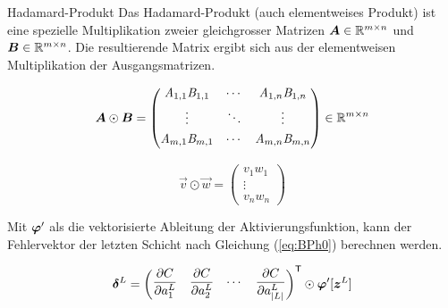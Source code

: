 \begin{appendices}
\begin{defbox}{Hadamard-Produkt}
  Das Hadamard-Produkt (auch elementweises Produkt) ist eine spezielle Multiplikation zweier gleichgrosser Matrizen
  $\bm{A} \in \mathbb{R}^{m \times n}$ und $\bm{B} \in \mathbb{R}^{m \times n}$.
  Die resultierende Matrix ergibt sich aus der elementweisen Multiplikation der Ausgangsmatrizen.

  \begin{minipage}{0.5\textwidth}
    \begin{equation*}
      \bm{A} \odot \bm{B} =
      \begin{pmatrix}
        \mathit{A}_{1,1} \mathit{B}_{1,1} & \cdots & \mathit{A}_{1,n} \mathit{B}_{1,n} \\[0.3em]
        \vdots & \ddots & \vdots \\[0.3em]
        \mathit{A}_{m,1} \mathit{B}_{m,1} & \cdots & \mathit{A}_{m,n} \mathit{B}_{m,n} \\[0.3em]
      \end{pmatrix}
      \in \mathbb{R}^{m \times n}
    \end{equation*}
  \end{minipage}
  \begin{minipage}{0.5\textwidth}
    \begin{equation*}
      \vec{v} \odot \vec{w} =
      \begin{pmatrix}
        v_1 w_1 \\
        \vdots \\
        v_n w_n
      \end{pmatrix}
    \end{equation*}

  \end{minipage}
\end{defbox}
\para{}

Mit $\bm{\varphi}'$ als die vektorisierte Ableitung der Aktivierungsfunktion,
kann der Fehlervektor der letzten Schicht nach Gleichung (\ref{eq:BPh0})
berechnen werden.

\begin{equation}\label{eq:BPh0}
  \bm{\delta}^L = \begin{pmatrix} \displaystyle\frac{\partial C}{\partial a_1^L} & \displaystyle\frac{\partial C}{\partial a_2^L} & \cdots & \displaystyle\frac{\partial C}{\partial a_{|L|}^L}\end{pmatrix}^{\mathsf{T}} \odot \bm{\varphi}'[\bm{z}^L]
\end{equation}


\end{appendices}
